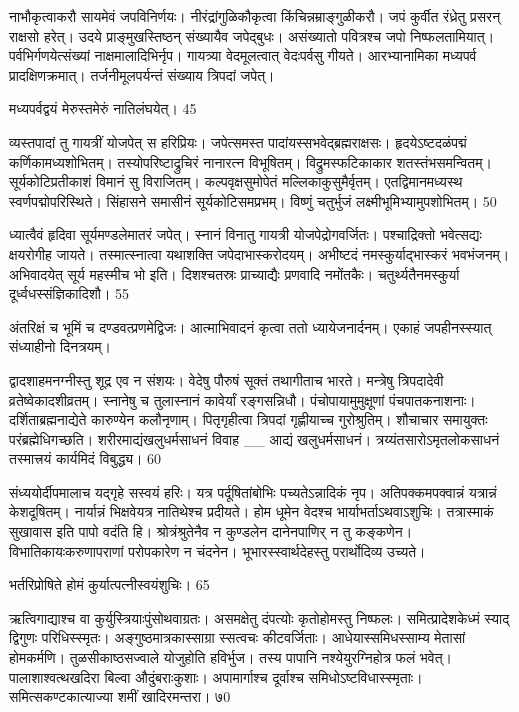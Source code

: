   नाभौकृत्वाकरौ सायमेवं जपविनिर्णयः।
 नीरंद्रांगुळिकौकृत्वा किंचिन्नम्राङ्गुळीकरौ।
 जपं कुर्वीत रंध्रेतु प्रसरन् राक्षसो हरेत्।
 उदये प्राङ्मुखस्तिष्ठन् संख्यायैव जपेद्बुधः।
 असंख्यातो पवित्रश्च जपो निष्फलतामियात्।
 पर्वभिर्गणयेत्संख्यां नाक्षमालादिभिर्नृप।
 गायत्र्या वेदमूलत्वात् वेदःपर्वसु गीयते।
 आरभ्यानामिका मध्यपर्व प्रादक्षिणक्रमात्।
 तर्जनीमूलपर्यन्तं संख्याय त्रिपदां जपेत्।
 
मध्यपर्वद्वयं मेरुस्तमेरुं नातिलंघयेत्।
45

 व्यस्तपादां तु गायत्रीं योजपेत् स हरिप्रियः।
 जपेत्समस्त पादांयस्सभवेद्ब्रह्मराक्षसः।
 हृदयेऽष्टदळंपद्मं कर्णिकामध्यशोभितम्।
 तस्योपरिष्टाद्रुचिरं नानारत्न विभूषितम्।
 विद्रुमस्फटिकाकार शतस्तंभसमन्वितम्।
 सूर्यकोटिप्रतीकाशं विमानं सु विराजितम्।
 कल्पवृक्षसुमोपेतं मल्लिकाकुसुमैर्वृतम्।
 एतद्विमानमध्यस्थ स्वर्णपद्मोपरिस्थिते।
 सिंहासने समासीनं सूर्यकोटिसमप्रभम्।
 विष्णुं चतुर्भुजं लक्ष्मीभूमिभ्यामुपशोभितम्।
 50

  ध्यात्वैवं हृदिवा सूर्यमण्डलेमातरं जपेत्।
 स्नानं विनातु गायत्री योजपेद्रोगवर्जितः।
 पश्चाद्रिक्तो भवेत्सद्यः क्षयरोगीह जायते।
 तस्मात्स्नात्वा यथाशक्ति जपेदाभास्करोदयम्।
 अभीष्टदं नमस्कुर्याद्भास्करं भवभंजनम्।
 अभिवादयेत् सूर्य महस्मीच भो इति।
 दिशश्चतस्रः प्राच्याद्यैः प्रणवादि नमोंतकैः।
 चतुर्थ्यतैनमस्कुर्या दूर्ध्वधस्संज्ञिकादिशौ।
 55

  अंतरिक्षं च भूमिं च दण्डवत्प्रणमेद्विजः।
 आत्माभिवादनं कृत्वा ततो ध्यायेजनार्दनम्।
 एकाहं जपहीनस्स्यात् संध्याहीनो दिनत्रयम्।
 
द्वादशाहमनग्नीस्तु शूद्र एव न संशयः।
 वेदेषु पौरुषं सूक्तं तथागीताच भारते।
 मन्त्रेषु त्रिपदादेवी व्रतेष्वेकादशीव्रतम्।
 स्नानेषु च तुलास्नानं कावेर्यां रङ्गसन्निधौ।
 पंचोपायामुमुक्षूणां पंचपातकनाशनाः।
 दर्शिताब्रह्मनाद्येते कारुण्येन कलौनृणाम्।
 पितृगृहीत्वा त्रिपदां गृह्णीयाच्च गुरोश्रुतिम्।
 शौचाचार समायुक्तः परंब्रह्मेधिगच्छति।
 शरीरमाद्यंखलुधर्मसाधनं विवाह
__ आद्यं खलुधर्मसाधनं।
 त्रय्यंतसारोऽमृतलोकसाधनं तस्मात्त्रयं
कार्यमिदं विबुद्ध्य।
 60

  संध्ययोर्दीपमालाच यद्गृहे सस्वयं हरिः।
 यत्र पर्दूषितांबोभिः पच्यतेऽन्नादिकं नृप।
 अतिपक्कमपक्वान्नं यत्रान्नं केशदूषितम्।
 नार्यान्नं भिक्षवेयत्र नातिथेश्च प्रदीयते।
 होम धूमेन वेदश्च भार्याभर्ताऽथवाऽशुचिः।
 तत्रास्माकं सुखावास इति पापो वदंति हि।
 श्रोत्रंश्रुतेनैव न कुण्डलेन
दानेनपाणिर् न तु कङ्कणेन।
 विभातिकायःकरुणापराणां परोपकारेण न चंदनेन।
 भूभारस्स्वार्थदेहस्तु परार्थोदिव्य उच्यते।
 
भर्तरिप्रोषिते होमं कुर्यात्पत्नीस्वयंशुचिः।
65

 ऋत्विगाद्याश्च वा कुर्युस्त्रियाःपुंसोथवाग्रतः।
 असमक्षेतु दंपत्योः कृतोहोमस्तु निष्फलः।
 समित्प्रादेशकेध्मं स्याद् द्विगुणः परिधिस्स्मृतः।
 अङ्गुष्ठमात्रकास्साग्रा स्सत्वचः कीटवर्जिताः।
 आधेयास्समिधस्साम्य मेतासां होमकर्मणि।
 तुळसीकाष्ठसज्वाले योजुहोति हविर्भुज।
 तस्य पापानि नश्येयुरग्निहोत्र फलं भवेत्।
 पालाशाश्वत्थखदिरा बिल्वा औदुंबराःकुशाः।
 अपामार्गाश्च दूर्वाश्च समिधोऽष्टविधास्स्मृताः।
 समित्सकण्टकात्याज्या शमीं खादिरमन्तरा।
 ७0


